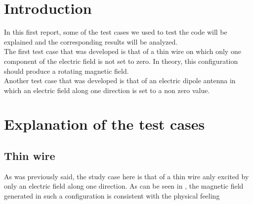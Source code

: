 \documentclass[12 pt]{report}
\begin{document}
\section{Introduction}
In this first report, some of the test cases we used to test the code will be explained and the corresponding results will be analyzed. \\
The first test case that was developed is that of a thin wire on which only one component of the electric field is not set to zero. In theory, this configuration should produce a rotating magnetic field. \\
Another test case that was developed is that of an electric dipole antenna in which an electric field along one direction is set to a non zero value.

\section{Explanation of the test cases}
\subsection{Thin wire}
As was previously said, the study case here is that of a thin wire anly excited by only an electric field along one direction. As can be seen in , the magnetic field generated in such a configuration is consistent with the physical feeling
\end{document}
